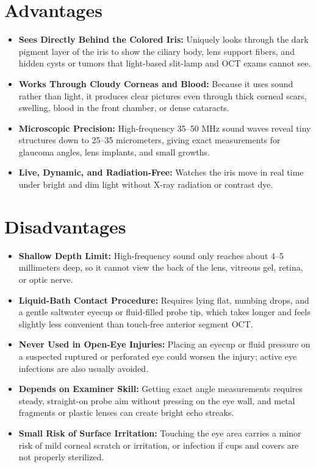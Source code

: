 \section{Advantages}

\begin{itemize}
    \item \textbf{Sees Directly Behind the Colored Iris:} Uniquely looks through the dark pigment layer of the iris to show the ciliary body, lens support fibers, and hidden cysts or tumors that light-based slit-lamp and OCT exams cannot see.
    \item \textbf{Works Through Cloudy Corneas and Blood:} Because it uses sound rather than light, it produces clear pictures even through thick corneal scars, swelling, blood in the front chamber, or dense cataracts.
    \item \textbf{Microscopic Precision:} High-frequency 35--50 MHz sound waves reveal tiny structures down to 25--35 micrometers, giving exact measurements for glaucoma angles, lens implants, and small growths.
    \item \textbf{Live, Dynamic, and Radiation-Free:} Watches the iris move in real time under bright and dim light without X-ray radiation or contrast dye.
\end{itemize}

\section{Disadvantages}

\begin{itemize}
    \item \textbf{Shallow Depth Limit:} High-frequency sound only reaches about 4--5 millimeters deep, so it cannot view the back of the lens, vitreous gel, retina, or optic nerve.
    \item \textbf{Liquid-Bath Contact Procedure:} Requires lying flat, numbing drops, and a gentle saltwater eyecup or fluid-filled probe tip, which takes longer and feels slightly less convenient than touch-free anterior segment OCT.
    \item \textbf{Never Used in Open-Eye Injuries:} Placing an eyecup or fluid pressure on a suspected ruptured or perforated eye could worsen the injury; active eye infections are also usually avoided.
    \item \textbf{Depends on Examiner Skill:} Getting exact angle measurements requires steady, straight-on probe aim without pressing on the eye wall, and metal fragments or plastic lenses can create bright echo streaks.
    \item \textbf{Small Risk of Surface Irritation:} Touching the eye area carries a minor risk of mild corneal scratch or irritation, or infection if cups and covers are not properly sterilized.
\end{itemize}

